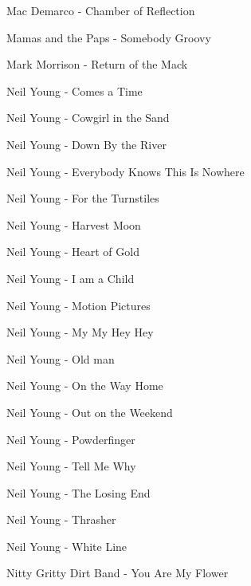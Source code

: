 Mac Demarco - Chamber of Reflection \dotfill \pageref{Chamber of Reflection - Mac Demarco} 

Mamas and the Paps - Somebody Groovy \dotfill \pageref{Somebody Groovy - Mamas and the Paps} 

Mark Morrison - Return of the Mack \dotfill \pageref{Return of the Mack - Mark Morrison} 

Neil Young - Comes a Time \dotfill \pageref{Comes a Time - Neil Young} 

Neil Young - Cowgirl in the Sand \dotfill \pageref{Cowgirl in the Sand - Neil Young} 

Neil Young - Down By the River \dotfill \pageref{Down By the River - Neil Young} 

Neil Young - Everybody Knows This Is Nowhere \dotfill \pageref{Everybody Knows This Is Nowhere - Neil Young} 

Neil Young - For the Turnstiles \dotfill \pageref{For the Turnstiles - Neil Young} 

Neil Young - Harvest Moon \dotfill \pageref{Harvest Moon - Neil Young} 

Neil Young - Heart of Gold \dotfill \pageref{Heart of Gold - Neil Young} 

Neil Young - I am a Child \dotfill \pageref{I am a Child - Neil Young} 

Neil Young - Motion Pictures \dotfill \pageref{Motion Pictures - Neil Young} 

Neil Young - My My Hey Hey \dotfill \pageref{My My Hey Hey - Neil Young} 

Neil Young - Old man \dotfill \pageref{Old man - Neil Young} 

Neil Young - On the Way Home \dotfill \pageref{On the Way Home - Neil Young} 

Neil Young - Out on the Weekend \dotfill \pageref{Out on the Weekend - Neil Young} 

Neil Young - Powderfinger \dotfill \pageref{Powderfinger - Neil Young} 

Neil Young - Tell Me Why \dotfill \pageref{Tell Me Why - Neil Young} 

Neil Young - The Losing End \dotfill \pageref{The Losing End - Neil Young} 

Neil Young - Thrasher \dotfill \pageref{Thrasher - Neil Young} 

Neil Young - White Line \dotfill \pageref{White Line - Neil Young} 

Nitty Gritty Dirt Band - You Are My Flower \dotfill \pageref{You Are My Flower - Nitty Gritty Dirt Band} 

